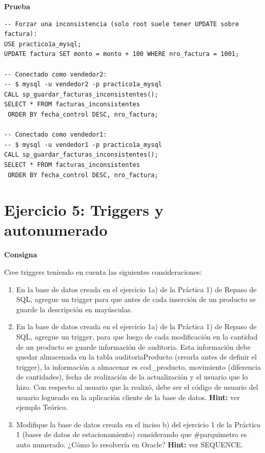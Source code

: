 \documentclass[11pt,a4paper]{article}
\newcommand{\itemcabecera}[1]{\noindent\textbf{#1}\par\medskip}
\newcommand{\bloqueConsigna}{\itemcabecera{Consigna}}
\newcommand{\bloquePrueba}{\itemcabecera{Prueba}}
\begin{document}
\bloquePrueba

\begin{lstlisting}
-- Forzar una inconsistencia (solo root suele tener UPDATE sobre factura):
USE practico1a_mysql;
UPDATE factura SET monto = monto + 100 WHERE nro_factura = 1001;

-- Conectado como vendedor2:
-- $ mysql -u vendedor2 -p practico1a_mysql
CALL sp_guardar_facturas_inconsistentes();
SELECT * FROM facturas_inconsistentes
 ORDER BY fecha_control DESC, nro_factura;

-- Conectado como vendedor1:
-- $ mysql -u vendedor1 -p practico1a_mysql
CALL sp_guardar_facturas_inconsistentes();
SELECT * FROM facturas_inconsistentes
 ORDER BY fecha_control DESC, nro_factura;
\end{lstlisting}

\section{Ejercicio 5: Triggers y autonumerado}

\bloqueConsigna

Cree triggers teniendo en cuenta las siguientes consideraciones:

\begin{enumerate}[label=\alph*),leftmargin=*]
    \item En la base de datos creada en el ejercicio 1a) de la Práctica 1) de Repaso de SQL, agregue un trigger para que antes de cada inserción de un producto se guarde la descripción en mayúsculas.
    \item En la base de datos creada en el ejercicio 1a) de la Práctica 1) de Repaso de SQL, agregue un trigger, para que luego de cada modificación en la cantidad de un producto se guarde información de auditoria. Esta información debe quedar almacenada en la tabla auditoriaProducto (crearla antes de definir el trigger), la información a almacenar es cod\_producto, movimiento (diferencia de cantidades), fecha de realización de la actualización y el usuario que lo hizo. Con respecto al usuario que la realizó, debe ser el código de usuario del usuario logueado en la aplicación cliente de la base de datos. \textbf{Hint:} ver ejemplo Teórico.
    \item Modifique la base de datos creada en el inciso b) del ejercicio 1 de la Práctica 1 (bases de datos de estacionamiento) considerando que \#parquimetro es auto numerado. ¿Cómo lo resolvería en Oracle? \textbf{Hint:} ver SEQUENCE.
\end{enumerate}
\end{document}

